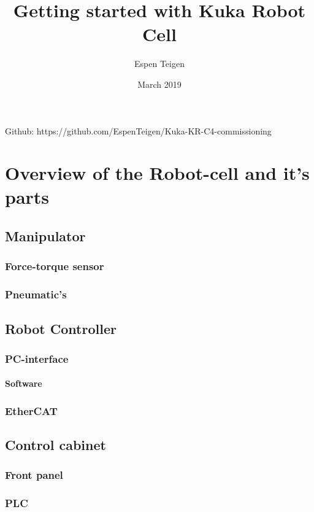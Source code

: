 \documentclass{article}
\title{Getting started with Kuka Robot Cell}
\author{Espen Teigen }
\date{March 2019}
\begin{document}
\maketitle

    Github: https://github.com/EspenTeigen/Kuka-KR-C4-commissioning

\newpage
\tableofcontents{}
\newpage

\section{Overview of the Robot-cell and it's parts}
    \subsection{Manipulator}
        \subsubsection{Force-torque sensor}
        \subsubsection{Pneumatic's}

    \subsection{Robot Controller}
        \subsubsection{PC-interface}
        \paragraph{Software}
        \subsubsection{EtherCAT}


    \subsection{Control cabinet}
        \subsubsection{Front panel}
        \subsubsection{PLC}
\end{document}
